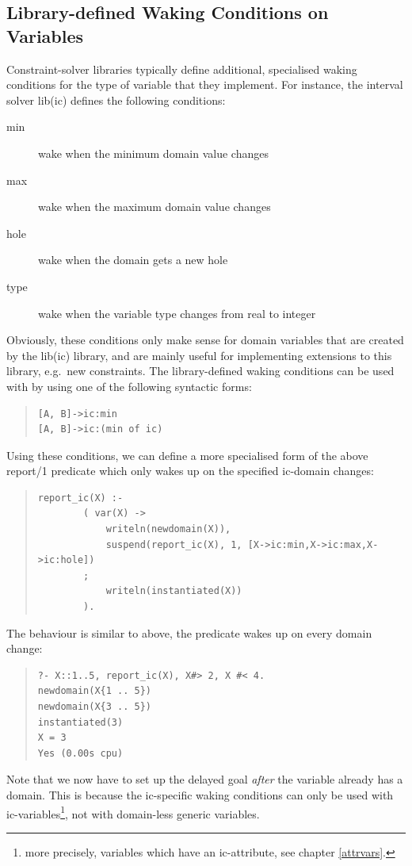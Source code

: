 \subsection{Library-defined Waking Conditions on Variables}

Constraint-solver libraries typically define additional, specialised
waking conditions for the type of variable that they implement.
For instance, the interval solver lib(ic) defines the following
conditions:
\begin{description}
\item[min] wake when the minimum domain value changes
\item[max] wake when the maximum domain value changes
\item[hole] wake when the domain gets a new hole
\item[type] wake when the variable type changes from real to integer
\end{description}
Obviously, these conditions only make sense for domain variables
that are created by the lib(ic) library, and are mainly useful for
implementing extensions to this library, e.g.\ new constraints.
The library-defined waking conditions can be used with
by using one of the following syntactic forms:
\begin{quote}\begin{verbatim}
[A, B]->ic:min
[A, B]->ic:(min of ic)
\end{verbatim}\end{quote}
Using these conditions, we can define a more specialised form of
the above report/1 predicate which only wakes up on the specified
ic-domain changes:
\begin{quote}\begin{verbatim}
report_ic(X) :-
        ( var(X) ->
            writeln(newdomain(X)),
            suspend(report_ic(X), 1, [X->ic:min,X->ic:max,X->ic:hole])
        ;
            writeln(instantiated(X))
        ).
\end{verbatim}\end{quote}
The behaviour is similar to above, the predicate wakes up on every
domain change:
\begin{quote}\begin{verbatim}
?- X::1..5, report_ic(X), X#> 2, X #< 4.
newdomain(X{1 .. 5})
newdomain(X{3 .. 5})
instantiated(3)
X = 3
Yes (0.00s cpu)
\end{verbatim}\end{quote}
Note that we now have to set up the delayed goal {\em after} the
variable already has a domain. This is because the ic-specific waking
conditions can only be used with ic-variables\footnote{more precisely,
variables which have an ic-attribute, see chapter \ref{attrvars}.},
not with domain-less generic variables.



